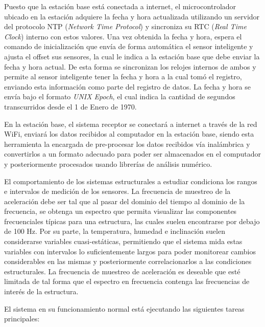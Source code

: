 Puesto que la estación base está conectada a internet, el microcontrolador ubicado en la estación adquiere la fecha y hora actualizada utilizando un servidor del protocolo NTP (\textit{Network Time Protocol}) y sincroniza su RTC (\textit{Real Time Clock}) interno con estos valores. Una vez obtenida la fecha y hora, espera el comando de inicialización que envía de forma automática el sensor inteligente y ajusta el offset sus sensores, la cual le indica a la estación base que debe enviar la fecha y hora actual. De esta forma se sincronizan los relojes internos de ambos y permite al sensor inteligente tener la fecha y hora a la cual tomó el registro, enviando esta información como parte del registro de datos. La fecha y hora se envía bajo el formato \textit{UNIX Epoch}, el cual indica la cantidad de segundos transcurridos desde el 1 de Enero de 1970.
	
En la estación base, el sistema receptor se conectará a internet a través de la red WiFi, enviará los datos recibidos al computador en la estación base, siendo esta herramienta la encargada de pre-procesar los datos recibidos vía inalámbrica y convertirlos a un formato adecuado para poder ser almacenados en el computador y posteriormente procesados usando librerías de análisis numérico.

El comportamiento de los sistemas estructurales a estudiar condiciona los rangos e intervalos de medición de los sensores. La frecuencia de muestreo de la aceleración debe ser tal que al pasar del dominio del tiempo al dominio de la frecuencia, se obtenga un espectro que permita visualizar las componentes frecuenciales típicas para una estructura, las cuales suelen encontrarse por debajo de 100 Hz. Por su parte, la temperatura, humedad e inclinación suelen considerarse variables cuasi-estáticas, permitiendo que el sistema mida estas variables con intervalos lo suficientemente largos para poder monitorear cambios considerables en las mismas y posteriormente correlacionarlos a las condiciones estructurales. La frecuencia de muestreo de aceleración es deseable que esté limitada de tal forma que el espectro en frecuencia contenga las frecuencias de interés de la estructura.

El sistema en su funcionamiento normal está ejecutando las siguientes tareas principales:


